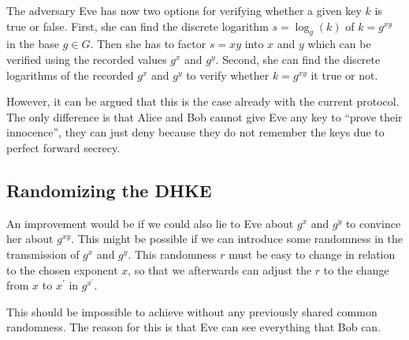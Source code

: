 The adversary Eve has now two options for verifying whether a given key \(k\) 
is true or false.
First, she can find the discrete logarithm \(s = \log_g( k )\) of \(k 
= g^{xy}\) in the base \(g\in G\).
Then she has to factor \(s = xy\) into \(x\) and \(y\) which can be verified 
using the recorded values \(g^x\) and \(g^y\).
Second, she can find the discrete logarithms of the recorded \(g^x\) and 
\(g^y\) to verify whether \(k = g^{xy}\) it true or not.

However, it can be argued that this is the case already with the current 
protocol.
The only difference is that Alice and Bob cannot give Eve any key to 
\enquote{prove their innocence}, they can just deny because they do not 
remember the keys due to perfect forward secrecy.

\subsection{Randomizing the \acs{DHKE}}\label{sec:random}

An improvement would be if we could also lie to Eve about \(g^x\) and \(g^y\) 
to convince her about \(g^{xy}\).
This might be possible if we can introduce some randomness in the transmission 
of \(g^x\) and \(g^y\).
This randomness \(r\) must be easy to change in relation to the chosen exponent 
\(x\), so that we afterwards can adjust the \(r\) to the change from \(x\) to 
\(x^\prime\) in \(g^{x^\prime}\).

This should be impossible to achieve without any previously shared common 
randomness.
The reason for this is that Eve can see everything that Bob can.


%
%
%


\printbibliography
